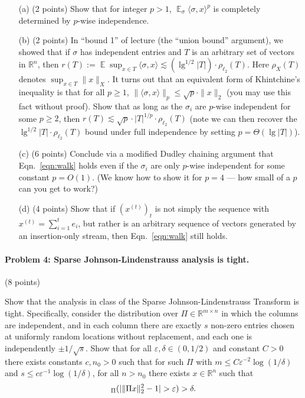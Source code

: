 \documentclass[12pt]{article}
\newcommand{\eps}{\varepsilon}
\newcommand{\R}{\mathbb{R}}
\newcommand{\inprod}[1]{\langle #1 \rangle}
\DeclareMathOperator*{\E}{\mathbb{E}}
\let\Pr\relax
\DeclareMathOperator*{\Pr}{\mathbb{P}}
\begin{document}
\begin{itemize}
\item[(a)] (2 points) Show that for integer $p>1$, $\E_\sigma \inprod{\sigma, x}^p$ is completely determined by $p$-wise independence.
\item[(b)] (2 points) In ``bound 1'' of lecture (the ``union bound'' argument), we showed that if $\sigma$ has independent entries and $T$ is an arbitrary set of vectors in $\R^n$, then $r(T) := \E \sup_{x\in T} \inprod{\sigma, x} \lesssim (\lg^{1/2} |T|)\cdot \rho_{\ell_2}(T)$. Here $\rho_X(T)$ denotes $\sup_{x\in T}\|x\|_X$.  It turns out that an equivalent form of Khintchine's inequality is that for all $p\ge 1$, $\|\inprod{\sigma, x}\|_p \le \sqrt{p} \cdot \|x\|_2$ (you may use this fact without proof). Show that as long as the $\sigma_i$ are $p$-wise independent for some $p\ge 2$, then $r(T) \lesssim \sqrt{p}\cdot |T|^{1/p}\cdot \rho_{\ell_2}(T)$ (note we can then recover the $\lg^{1/2}|T|\cdot \rho_{\ell_2}(T)$ bound under full independence by setting $p = \Theta(\lg |T|)$).
\item[(c)] (6 points) Conclude via a modified Dudley chaining argument that Eqn.~\eqref{eqn:walk} holds even if the $\sigma_i$ are only $p$-wise independent for some constant $p = O(1)$. (We know how to show it for $p=4$ --- how small of a $p$ can you get to work?)
\item[(d)] (4 points) Show that if $(x^{(t)})_t$ is not simply the sequence with $x^{(t)} = \sum_{i=1}^t e_i$, but rather is an arbitrary sequence of vectors generated by an insertion-only stream, then Eqn.~\eqref{eqn:walk} still holds.
\end{itemize}

\paragraph{Problem 4: Sparse Johnson-Lindenstrauss analysis is tight.} (8 points)

Show that the analysis in class of the Sparse Johnson-Lindenstrauss Transform is tight. Specifically, consider the distribution over $\Pi\in\R^{m\times n}$ in which the columns are independent, and in each column there are exactly $s$ non-zero entries chosen at uniformly random locations without replacement, and each one is independently $\pm 1/\sqrt{s}$. Show that for all $\eps,\delta \in (0, 1/2)$ and constant $C>0$ there exists constants $c, n_0 >0$ such that for such $\Pi$ with $m \le C \eps^{-2}\log(1/\delta)$ and $s\le c\eps^{-1}\log(1/\delta)$, for all $n>n_0$ there exists $x\in\R^n$ such that
$$
\Pr_\Pi(| \|\Pi x\|_2^2 - 1| > \eps) > \delta .
$$
\end{document}
